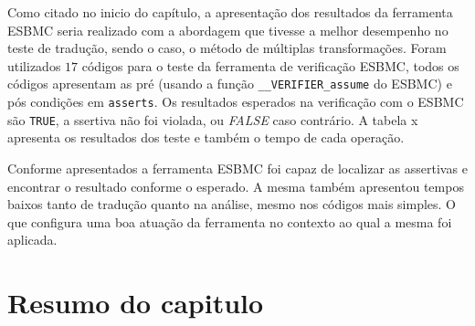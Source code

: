 Como citado no inicio do capítulo, a apresentação dos resultados da ferramenta ESBMC seria realizado com a abordagem que tivesse a melhor desempenho no teste de tradução, sendo o caso, o método de múltiplas transformações. Foram utilizados $17$ códigos para o teste da ferramenta de verificação ESBMC, todos os códigos apresentam as pré (usando a função \texttt{\_\_VERIFIER\_assume} do ESBMC) e pós condições  em \texttt{asserts}. 
Os resultados esperados na verificação com o ESBMC são \texttt{TRUE}, a ssertiva não foi violada, ou \textit{FALSE} caso contrário. A tabela x apresenta os resultados dos teste e também o tempo de cada operação.


\par
Conforme apresentados a ferramenta ESBMC foi capaz de localizar as assertivas e encontrar o resultado conforme o esperado. A mesma também apresentou tempos baixos tanto de tradução quanto na análise, mesmo nos códigos mais simples. O que configura uma boa atuação da ferramenta no contexto ao qual a mesma foi aplicada.



\section{Resumo do capitulo}